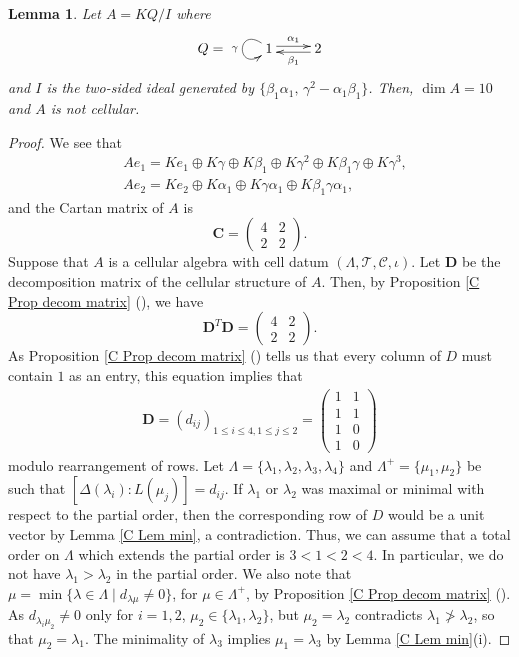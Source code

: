 \documentclass[12pt]{amsart}
\newtheorem{lem}[thm]{Lemma}
\numberwithin{equation}{thm}
\newcommand\bC{\mathbf C}
\newcommand\bD{\mathbf D}
\newcommand\cC{\mathcal{C}}
\newcommand\cT{\mathcal{T}}
\renewcommand\a{\alpha}  %
\renewcommand\b{\beta}   %
\newcommand\g{\gamma}
\newcommand\la{\lambda}
\newcommand\D{\Delta}
\newcommand\vL{\varLambda}
\newcounter{ichi}
\newcommand{\roi}{\roman{ichi}}
\newcounter{ni}
\newcounter{san}
\newcommand{\roiii}{\roman{san}}
\begin{document}

\begin{lem} 
\label{F Lemma DB 2}
Let $A=KQ / I$ where
\[
\xymatrix{Q = & 1 \ar@(ul,dl)_{\g } \ar[r]<0.5 ex>^{\a_1}  & 2 \ar[l]<0.5 ex>^{\b_1}}
\]
and $I$ is the two-sided ideal generated by 
$\{ \b_1 \a_1, \, \g^2 - \a_1 \b_1\}$. 
Then, $\dim A = 10$ and $A$ is not cellular.
\end{lem}

\begin{proof} 
We see that 
\begin{align*}
& A e_1 = K e_1 \oplus K \g \oplus K \b_1 \oplus K \g^2 \oplus K \b_1 \g \oplus K \g^3, 
\\
& A e_2 = K e_2 \oplus K \a_1 \oplus K \g \a_1 \oplus K \b_1 \g \a_1, 
\end{align*} 
and the Cartan matrix of $A$ is
\[
\bC= \begin{pmatrix} 4 & 2 \\ 2 & 2 \end{pmatrix}. 
\]
Suppose that $A$ is a cellular algebra with cell datum $(\vL, \cT, \cC, \iota)$. 
Let $\bD$ be the decomposition matrix of the cellular structure of $A$. 
Then, by Proposition \ref{C Prop decom matrix} (\roiii), 
we have 
\[
\bD^T \bD = \begin{pmatrix} 4 & 2 \\ 2 & 2 \end{pmatrix}. 
\]
As Proposition \ref{C Prop decom matrix} (\roi) tells us that every column of $D$ must contain $1$ as an entry, this equation implies that 
\begin{align*}
\bD= (d_{ij})_{1\leq i \leq 4, 1 \leq j \leq 2}=\begin{pmatrix} 1 & 1 \\ 1 & 1 \\ 1& 0 \\ 1 & 0 \end{pmatrix}
\end{align*} 
modulo rearrangement of rows.  
Let $\vL=\{\la_1,\la_2, \la_3,\la_4\}$ and $\vL^+=\{ \mu_1, \mu_2\}$ be  such that 
$[ \D(\la_i) : L(\mu_j) ] = d_{ij}$. If $\la_1$ or $\la_2$ was maximal or minimal with respect to the partial order, then 
the corresponding row of $D$ would be a unit vector by Lemma \ref{C Lem min}, a contradiction. Thus, 
we can assume that 
a total order on $\vL$ which extends the partial order is 
$3<1<2<4$. In particular, we do not have $\la_1>\la_2$ in the partial order. 
We also note that $\mu = \min\{ \la \in \vL \mid d_{\la\mu}\ne0 \}$, for $\mu\in \vL^+$, by 
Proposition \ref{C Prop decom matrix} (\roi). As $d_{\la_i\mu_2}\ne0$ only for $i=1,2$, $\mu_2\in\{\la_1,\la_2\}$, but
$\mu_2=\la_2$ contradicts $\la_1\not>\la_2$, so that $\mu_2=\la_1$. The minimality of $\la_3$ implies
$\mu_1=\la_3$ by Lemma \ref{C Lem min}(i).


\end{proof}
\end{document}
